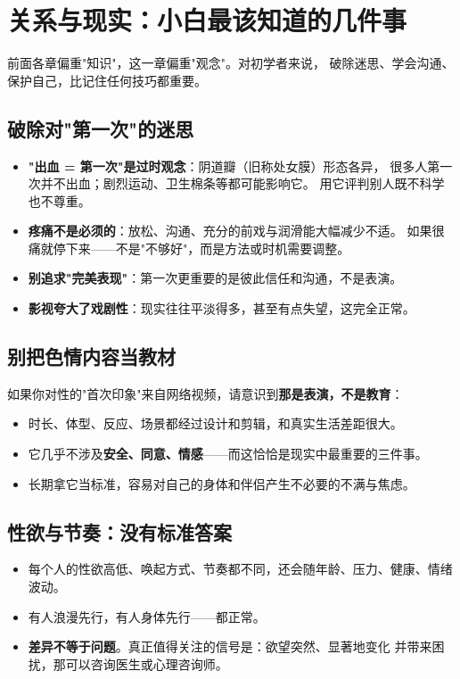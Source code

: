 \chapter{关系与现实：小白最该知道的几件事}
\label{chap:reality}

前面各章偏重"知识"，这一章偏重"观念"。对初学者来说，
破除迷思、学会沟通、保护自己，比记住任何技巧都重要。

\section{破除对"第一次"的迷思}

\begin{itemize}[leftmargin=2em]
  \item \textbf{"出血 = 第一次"是过时观念}：阴道瓣（旧称处女膜）形态各异，
        很多人第一次并不出血；剧烈运动、卫生棉条等都可能影响它。
        用它评判别人既不科学也不尊重。
  \item \textbf{疼痛不是必须的}：放松、沟通、充分的前戏与润滑能大幅减少不适。
        如果很痛就停下来——不是"不够好"，而是方法或时机需要调整。
  \item \textbf{别追求"完美表现"}：第一次更重要的是彼此信任和沟通，不是表演。
  \item \textbf{影视夸大了戏剧性}：现实往往平淡得多，甚至有点失望，这完全正常。
\end{itemize}

\section{别把色情内容当教材}

如果你对性的"首次印象"来自网络视频，请意识到\textbf{那是表演，不是教育}：

\begin{itemize}[leftmargin=2em]
  \item 时长、体型、反应、场景都经过设计和剪辑，和真实生活差距很大。
  \item 它几乎不涉及\textbf{安全、同意、情感}——而这恰恰是现实中最重要的三件事。
  \item 长期拿它当标准，容易对自己的身体和伴侣产生不必要的不满与焦虑。
\end{itemize}

\section{性欲与节奏：没有标准答案}

\begin{itemize}[leftmargin=2em]
  \item 每个人的性欲高低、唤起方式、节奏都不同，还会随年龄、压力、健康、情绪波动。
  \item 有人浪漫先行，有人身体先行——都正常。
  \item \textbf{差异不等于问题}。真正值得关注的信号是：欲望突然、显著地变化
        并带来困扰，那可以咨询医生或心理咨询师。
\end{itemize}

